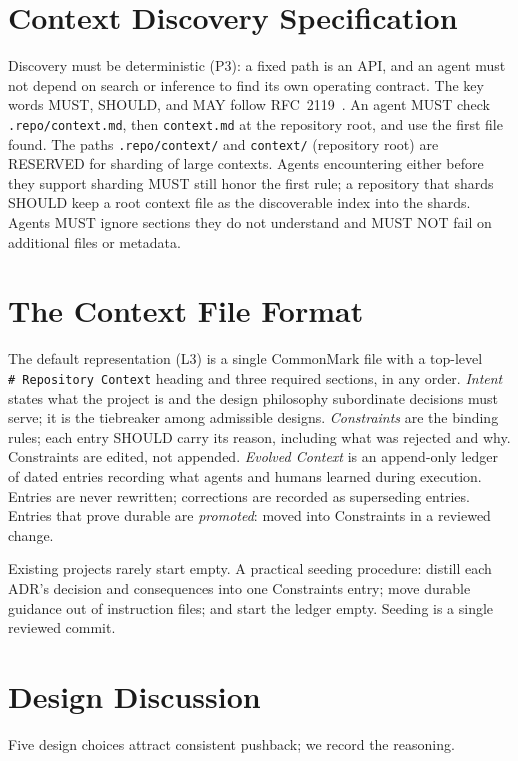 \documentclass[sigconf,nonacm]{acmart}
\newcommand{\ctx}{\texttt{context.md}}
\begin{document}
\section{Context Discovery Specification}\label{sec:discovery}
Discovery must be deterministic (P3): a fixed path is an API, and an agent must not
depend on search or inference to find its own operating contract. The key words
MUST, SHOULD, and MAY follow RFC~2119~\cite{rfc2119}. An agent MUST check
\texttt{.repo/context.md}, then \ctx{} at the repository root, and use the first
file found. The paths \texttt{.repo/context/} and \texttt{context/} (repository
root) are RESERVED for sharding of large contexts. Agents encountering either
before they support sharding MUST still honor the first rule; a repository that
shards SHOULD keep a root context file as the discoverable index into the shards.
Agents MUST ignore sections they do not understand and MUST NOT fail on additional
files or metadata.

\section{The Context File Format}\label{sec:format}
The default representation (L3) is a single CommonMark file with a top-level
\texttt{\#~Repository Context} heading and three required sections, in any order.
\emph{Intent} states what the project is and the design philosophy subordinate
decisions must serve; it is the tiebreaker among admissible designs.
\emph{Constraints} are the binding rules; each entry SHOULD carry its reason,
including what was rejected and why. Constraints are edited, not appended.
\emph{Evolved Context} is an append-only ledger of dated entries recording what
agents and humans learned during execution. Entries are never rewritten;
corrections are recorded as superseding entries. Entries that prove durable are
\emph{promoted}: moved into Constraints in a reviewed change.

Existing projects rarely start empty. A practical seeding procedure: distill each
ADR's decision and consequences into one Constraints entry; move durable guidance
out of instruction files; and start the ledger empty. Seeding is a single reviewed
commit.

\section{Design Discussion}\label{sec:design}
Five design choices attract consistent pushback; we record the reasoning.
\end{document}
